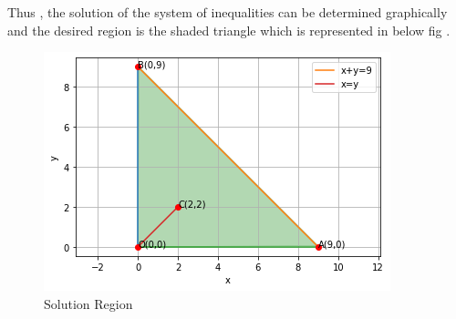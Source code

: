 \documentclass[journal,12pt,twocolumn]{IEEEtran}
\begin{document}
Thus , the solution of the system of inequalities can be determined graphically and the desired region is the shaded triangle which is represented in below fig
.
\begin{figure}[!ht]
\centering
\includegraphics[width=\columnwidth]{Figure 10.png}
\caption{Solution Region}
\label{fig:fig1}	
\end{figure}
\end{document}
